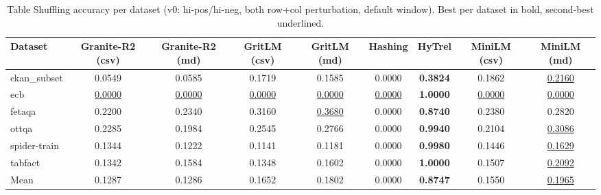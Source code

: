 \begin{table}[t]
\centering
\begin{tabular*}{\textwidth}{lcccccccc}
\hline
Dataset & Granite-R2 (csv) & Granite-R2 (md) & GritLM (csv) & GritLM (md) & Hashing & HyTrel & MiniLM (csv) & MiniLM (md) \\
\hline
ckan\_subset & 0.0549 & 0.0585 & 0.1719 & 0.1585 & 0.0000 & \textbf{0.3824} & 0.1862 & \underline{0.2160} \\
ecb & \underline{0.0000} & \underline{0.0000} & \underline{0.0000} & \underline{0.0000} & \underline{0.0000} & \textbf{1.0000} & \underline{0.0000} & \underline{0.0000} \\
fetaqa & 0.2200 & 0.2340 & 0.3160 & \underline{0.3680} & 0.0000 & \textbf{0.8740} & 0.2380 & 0.2820 \\
ottqa & 0.2285 & 0.1984 & 0.2545 & 0.2766 & 0.0000 & \textbf{0.9940} & 0.2104 & \underline{0.3086} \\
spider-train & 0.1344 & 0.1222 & 0.1141 & 0.1181 & 0.0000 & \textbf{0.9980} & 0.1446 & \underline{0.1629} \\
tabfact & 0.1342 & 0.1584 & 0.1348 & 0.1602 & 0.0000 & \textbf{1.0000} & 0.1507 & \underline{0.2092} \\
Mean & 0.1287 & 0.1286 & 0.1652 & 0.1802 & 0.0000 & \textbf{0.8747} & 0.1550 & \underline{0.1965} \\
\hline
\end{tabular*}
\caption{Table Shuffling accuracy per dataset (v0: hi-pos/hi-neg, both row+col perturbation, default window). Best per dataset in bold, second-best underlined.}
\label{tab:shuffling_accuracy}
\end{table}
